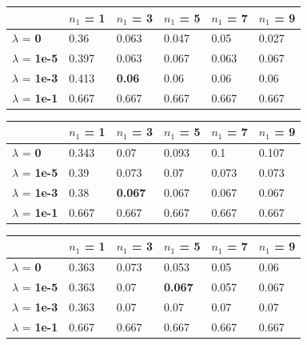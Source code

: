 \documentclass[10pt]{article}
\begin{document}
\begin{table}
\centering
\begin{tabular}{llllll}
\toprule
& $n_1$ = \bf{1} & $n_1$ =  \bf{3} & $n_1$ =  \bf{5} & $n_1$ =  \bf{7} & $n_1$ =  \bf{9} \\
\midrule
$\lambda$ = \bf{0} &  0.36  & 0.063 & 0.047 & 0.05  & 0.027 \\
$\lambda$ = \bf{1e-5} & 0.397 & 0.063 & 0.067 & 0.063 & 0.067 \\
$\lambda$ = \bf{1e-3} & 0.413 & \bf{0.06}  & 0.06  & 0.06  & 0.06  \\
$\lambda$ = \bf{1e-1} & 0.667 & 0.667 & 0.667 & 0.667 & 0.667 \\
\bottomrule
\end{tabular}
\end{table}

\begin{table}
\centering
\begin{tabular}{llllll}
\toprule
& $n_1$ = \bf{1} & $n_1$ =  \bf{3} & $n_1$ =  \bf{5} & $n_1$ =  \bf{7} & $n_1$ =  \bf{9} \\
\midrule
$\lambda$ = \bf{0} &      0.343 & 0.07  & 0.093 & 0.1   & 0.107 \\
$\lambda$ = \bf{1e-5} &   0.39  & 0.073 & 0.07  & 0.073 & 0.073 \\
$\lambda$ = \bf{1e-3} &  0.38  & \bf{0.067} & 0.067 & 0.067 & 0.067 \\
$\lambda$ = \bf{1e-1} &  0.667 & 0.667 & 0.667 & 0.667 & 0.667 \\
\bottomrule
\end{tabular}
\end{table}

\begin{table}
\centering
\begin{tabular}{llllll}
\toprule
& $n_1$ = \bf{1} & $n_1$ =  \bf{3} & $n_1$ =  \bf{5} & $n_1$ =  \bf{7} & $n_1$ =  \bf{9} \\
\midrule
$\lambda$ = \bf{0} &       0.363 & 0.073 & 0.053 & 0.05  & 0.06  \\
$\lambda$ = \bf{1e-5} &   0.363 & 0.07  & \bf{0.067} & 0.057 & 0.067 \\
$\lambda$ = \bf{1e-3} &   0.363 & 0.07  & 0.07  & 0.07  & 0.07  \\
$\lambda$ = \bf{1e-1} &   0.667 & 0.667 & 0.667 & 0.667 & 0.667 \\
\bottomrule
\end{tabular}
\end{table}
	
\end{document}
